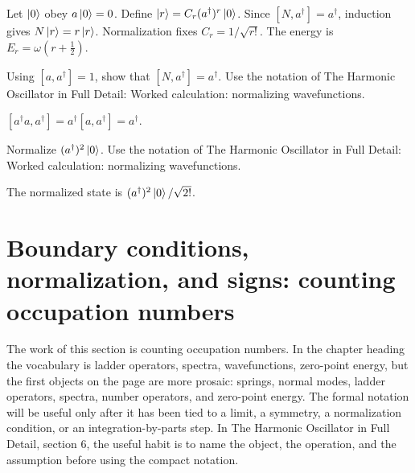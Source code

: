 \begin{example}
Let \(\left|0\right\rangle\) obey \(a\left|0\right\rangle=0\).  Define \(\left|r\right\rangle=C_r(a^\dagger)^r\left|0\right\rangle\).  Since \([N,a^\dagger]=a^\dagger\), induction gives \(N\left|r\right\rangle=r\left|r\right\rangle\).  Normalization fixes \(C_r=1/\sqrt{r!}\).  The energy is \(E_r=\omega(r+\frac12)\).
\end{example}



\begin{exercise}
Using \([a,a^\dagger]=1\), show that \([N,a^\dagger]=a^\dagger\).  Use the notation of The Harmonic Oscillator in Full Detail: Worked calculation: normalizing wavefunctions.
\begin{answer}
\([a^\dagger a,a^\dagger]=a^\dagger[a,a^\dagger]=a^\dagger\).
\end{answer}
\end{exercise}

\begin{exercise}
Normalize \((a^\dagger)^2\left|0\right\rangle\).  Use the notation of The Harmonic Oscillator in Full Detail: Worked calculation: normalizing wavefunctions.
\begin{answer}
The normalized state is \((a^\dagger)^2\left|0\right\rangle/\sqrt{2!}\).
\end{answer}
\end{exercise}



\section{Boundary conditions, normalization, and signs: counting occupation numbers}













The work of this section is counting occupation numbers.  In the chapter heading the vocabulary is ladder operators, spectra, wavefunctions, zero-point energy, but the first objects on the page are more prosaic: springs, normal modes, ladder operators, spectra, number operators, and zero-point energy.  The formal notation will be useful only after it has been tied to a limit, a symmetry, a normalization condition, or an integration-by-parts step.  In The Harmonic Oscillator in Full Detail, section 6, the useful habit is to name the object, the operation, and the assumption before using the compact notation.

